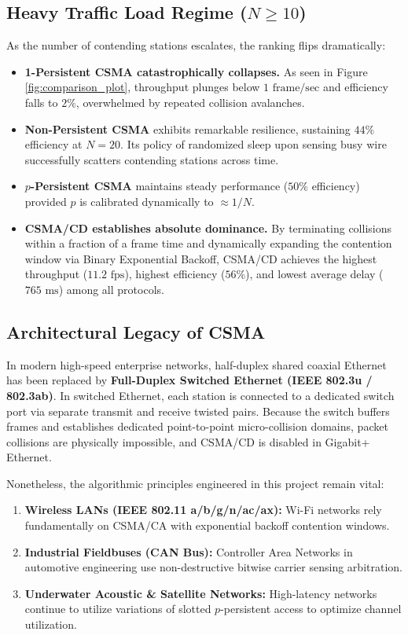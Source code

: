 \documentclass[12pt, a4paper]{article}
\begin{document}
\subsection{Heavy Traffic Load Regime ($N \ge 10$)}
As the number of contending stations escalates, the ranking flips dramatically:
\begin{itemize}
    \item \textbf{1-Persistent CSMA catastrophically collapses.} As seen in Figure \ref{fig:comparison_plot}, throughput plunges below $1\text{ frame/sec}$ and efficiency falls to $2\%$, overwhelmed by repeated collision avalanches.
    \item \textbf{Non-Persistent CSMA} exhibits remarkable resilience, sustaining $44\%$ efficiency at $N = 20$. Its policy of randomized sleep upon sensing busy wire successfully scatters contending stations across time.
    \item \textbf{$p$-Persistent CSMA} maintains steady performance ($50\%$ efficiency) provided $p$ is calibrated dynamically to $\approx 1/N$.
    \item \textbf{CSMA/CD establishes absolute dominance.} By terminating collisions within a fraction of a frame time and dynamically expanding the contention window via Binary Exponential Backoff, CSMA/CD achieves the highest throughput ($11.2\text{ fps}$), highest efficiency ($56\%$), and lowest average delay ($765\text{ ms}$) among all protocols.
\end{itemize}

\subsection{Architectural Legacy of CSMA}
In modern high-speed enterprise networks, half-duplex shared coaxial Ethernet has been replaced by \textbf{Full-Duplex Switched Ethernet (IEEE 802.3u / 802.3ab)}. In switched Ethernet, each station is connected to a dedicated switch port via separate transmit and receive twisted pairs. Because the switch buffers frames and establishes dedicated point-to-point micro-collision domains, packet collisions are physically impossible, and CSMA/CD is disabled in Gigabit+ Ethernet.

Nonetheless, the algorithmic principles engineered in this project remain vital:
\begin{enumerate}
    \item \textbf{Wireless LANs (IEEE 802.11 a/b/g/n/ac/ax):} Wi-Fi networks rely fundamentally on CSMA/CA with exponential backoff contention windows.
    \item \textbf{Industrial Fieldbuses (CAN Bus):} Controller Area Networks in automotive engineering use non-destructive bitwise carrier sensing arbitration.
    \item \textbf{Underwater Acoustic \& Satellite Networks:} High-latency networks continue to utilize variations of slotted $p$-persistent access to optimize channel utilization.
\end{enumerate}
\end{document}
